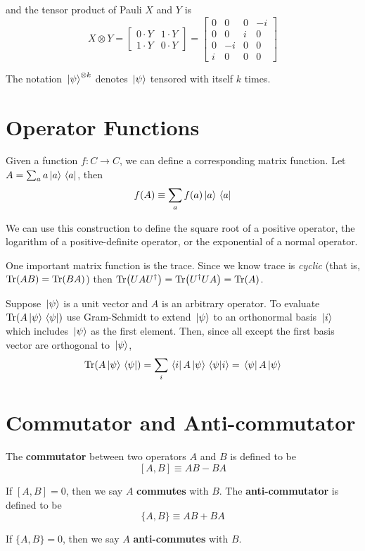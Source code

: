 and the tensor product of Pauli $X$ and $Y$ is 
$$X \otimes Y = \begin{bmatrix}
0 \cdot Y & 1 \cdot Y \\
1 \cdot Y & 0 \cdot Y
\end{bmatrix} = \begin{bmatrix}
0 & 0 & 0 & -i \\
0 & 0 & i & 0 \\
0 & -i & 0 & 0 \\
i & 0 & 0 & 0
\end{bmatrix}$$

The notation $\ket*{\psi}^{\otimes k}$ denotes $\ket*{\psi}$ tensored with itself $k$ times. 

\section{Operator Functions}

Given a function $f: C \rightarrow C$, we can define a corresponding matrix function. Let $A = \sum_{a} a \ket*{a} \bra*{a}$, then 
$$f(A) \equiv \sum_{a} f(a) \ket*{a} \bra*{a}$$

We can use this construction to define the square root of a positive operator, the logarithm of a positive-definite operator, or the exponential of a normal operator. 

One important matrix function is the trace. Since we know trace is \textit{cyclic} (that is, $\Tr(AB) = \Tr(BA)$) then $\Tr(UAU^{\dagger}) = \Tr(U^{\dagger}UA) = \Tr(A)$. 

Suppose $\ket*{\psi}$ is a unit vector and $A$ is an arbitrary operator. To evaluate $\Tr(A\ket*{\psi} \bra*{\psi})$ use Gram-Schmidt to extend $\ket*{\psi}$ to an orthonormal basis $\ket*{i}$ which includes $\ket*{\psi}$ as the first element. Then, since all except the first basis vector are orthogonal to $\ket*{\psi}$,  
$$\Tr(A \ket*{\psi} \bra*{\psi}) = \sum_{i} \bra*{i}A\ket*{\psi} \bra*{\psi}\ket*{i} = \bra*{\psi}A\ket*{\psi}$$

\section{Commutator and Anti-commutator} 

\begin{definition}
The \textbf{commutator} between two operators $A$ and $B$ is defined to be 
$$[A, B] \equiv AB - BA$$

If $[A, B] = 0$, then we say $A$ \textbf{commutes} with $B$. The \textbf{anti-commutator} is defined to be 
$$\{A, B\} \equiv AB + BA$$

If $\{ A, B \} = 0$, then we say $A$ \textbf{anti-commutes} with $B$. 
\end{definition}

